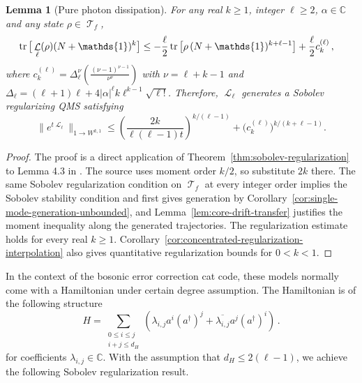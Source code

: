 \documentclass[11pt]{article}
\theoremstyle{myplain}
\newtheorem{lem}[lem]{Lemma}
\theoremstyle{mydefinition}
\theoremstyle{remark}
\DeclareMathOperator{\cL}{\mathcal{L}}
\DeclareMathOperator{\cT}{\mathcal{T}}
\DeclareMathOperator{\1}{\mathds{1}}
\newcommand{\tr}[1][]{\operatorname{tr}%
  \ifx#1\empty \else \left[ #1 \right] \fi}
\begin{document}
        \begin{lem}[Pure photon dissipation]\label{lem:l-diss}
            For any real $k \geq 1$, integer $\ell \geq 2$, $\alpha \in \mathbb{C}$ and any state $\rho \in \cT_f$,
            \begin{align*}
                \tr\big[\cL_\ell(\rho)(N+\1)^{k}\big]&\le -\frac{\ell}{2} \tr\big[\rho\,(N+\1)^{k+\ell-1}\big]+\frac{\ell}{2}c_k^{(\ell)}\,,
            \end{align*}
            where $c_k^{(\ell)}=\Delta_\ell^\nu\left(\frac{(\nu-1)^{\nu-1}}{\nu^\nu}\right)$ with $\nu=\ell+k-1$ and $\Delta_\ell=(\ell+1)\ell+4|\alpha|^\ell k\ell^{k - 1}\sqrt{\ell!}$. Therefore, $\cL_\ell$ generates a Sobolev regularizing QMS satisfying
            \begin{equation*}
                \| e^{t \cL_\ell} \|_{1 \to W^{k,1}} \le
                \left(\frac{2k}{\ell(\ell-1)t}\right)^{k/(\ell-1)}
                +\bigl(c_k^{(\ell)}\bigr)^{k/(k+\ell-1)} .
            \end{equation*}

        \end{lem}
        \begin{proof}
            The proof is a direct application of Theorem~\ref{thm:sobolev-regularization} to Lemma 4.3 in \cite{Gondolf.2024}. The source uses moment order $k/2$, so substitute $2k$ there. The same Sobolev regularization condition on $\cT_f$ at every integer order implies the Sobolev stability condition and first gives generation by Corollary~\ref{cor:single-mode-generation-unbounded}, and Lemma~\ref{lem:core-drift-transfer} justifies the moment inequality along the generated trajectories. The regularization estimate holds for every real $k\geq1$. Corollary~\ref{cor:concentrated-regularization-interpolation} also gives quantitative regularization bounds for $0<k<1$.
        \end{proof}
        In the context of the bosonic error correction cat code, these models normally come with a Hamiltonian under certain degree assumption. The Hamiltonian is of the following structure
        \begin{equation}\label{eq:single-mode-H}
            H=\sum_{\substack{0\leq i \le j\\i+j \le d_H}}\left(\lambda_{i,j}a^i(a^\dagger)^j + \overline{\lambda_{i,j}} a^j (a^\dagger)^i\right) \, .
        \end{equation}
        for coefficients $\lambda_{i,j}\in\mathbb C$. With the assumption that $d_H \leq 2(\ell-1)$, we achieve the following Sobolev regularization result.
\end{document}
